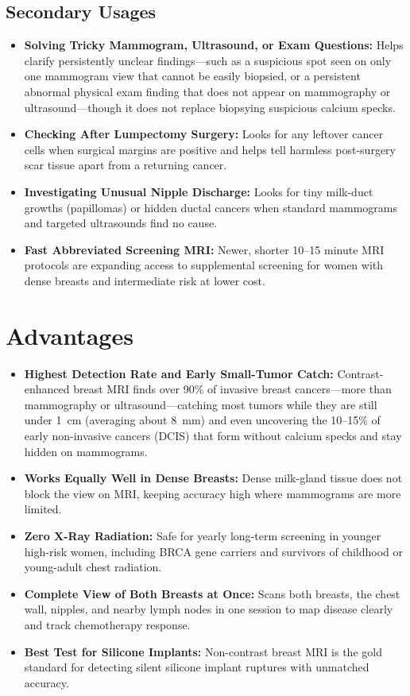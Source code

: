 \subsection{Secondary Usages}
\begin{itemize}
\item \textbf{Solving Tricky Mammogram, Ultrasound, or Exam Questions:} Helps clarify persistently unclear findings---such as a suspicious spot seen on only one mammogram view that cannot be easily biopsied, or a persistent abnormal physical exam finding that does not appear on mammography or ultrasound---though it does not replace biopsying suspicious calcium specks.
\item \textbf{Checking After Lumpectomy Surgery:} Looks for any leftover cancer cells when surgical margins are positive and helps tell harmless post-surgery scar tissue apart from a returning cancer.
\item \textbf{Investigating Unusual Nipple Discharge:} Looks for tiny milk-duct growths (papillomas) or hidden ductal cancers when standard mammograms and targeted ultrasounds find no cause.
\item \textbf{Fast Abbreviated Screening MRI:} Newer, shorter 10--15 minute MRI protocols are expanding access to supplemental screening for women with dense breasts and intermediate risk at lower cost.
\end{itemize}

\section{Advantages}
\begin{itemize}
\item \textbf{Highest Detection Rate and Early Small-Tumor Catch:} Contrast-enhanced breast MRI finds over 90\% of invasive breast cancers---more than mammography or ultrasound---catching most tumors while they are still under 1~cm (averaging about 8~mm) and even uncovering the 10--15\% of early non-invasive cancers (DCIS) that form without calcium specks and stay hidden on mammograms.
\item \textbf{Works Equally Well in Dense Breasts:} Dense milk-gland tissue does not block the view on MRI, keeping accuracy high where mammograms are more limited.
\item \textbf{Zero X-Ray Radiation:} Safe for yearly long-term screening in younger high-risk women, including BRCA gene carriers and survivors of childhood or young-adult chest radiation.
\item \textbf{Complete View of Both Breasts at Once:} Scans both breasts, the chest wall, nipples, and nearby lymph nodes in one session to map disease clearly and track chemotherapy response.
\item \textbf{Best Test for Silicone Implants:} Non-contrast breast MRI is the gold standard for detecting silent silicone implant ruptures with unmatched accuracy.
\end{itemize}

